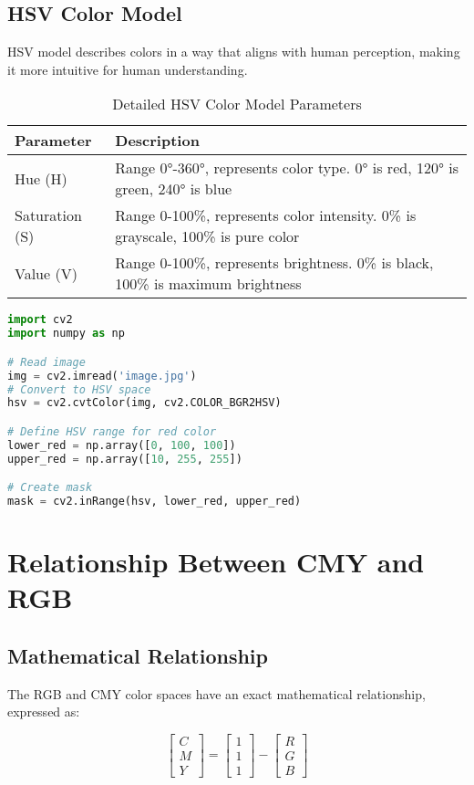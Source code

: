 \documentclass[12pt]{article}
\begin{document}
\subsection{HSV Color Model}
HSV model describes colors in a way that aligns with human perception, making it more intuitive for human understanding.

\begin{table}[H]
    \centering
    \begin{tabular}{lp{12cm}}
    \toprule
    \textbf{Parameter} & \textbf{Description} \\
    \midrule
    Hue (H) & Range 0°-360°, represents color type. 0° is red, 120° is green, 240° is blue \\
    Saturation (S) & Range 0-100\%, represents color intensity. 0\% is grayscale, 100\% is pure color \\
    Value (V) & Range 0-100\%, represents brightness. 0\% is black, 100\% is maximum brightness \\
    \bottomrule
    \end{tabular}
    \caption{Detailed HSV Color Model Parameters}
\end{table}

\begin{lstlisting}[language=python, caption=HSV Color Detection in OpenCV]
import cv2
import numpy as np

# Read image
img = cv2.imread('image.jpg')
# Convert to HSV space
hsv = cv2.cvtColor(img, cv2.COLOR_BGR2HSV)

# Define HSV range for red color
lower_red = np.array([0, 100, 100])
upper_red = np.array([10, 255, 255])

# Create mask
mask = cv2.inRange(hsv, lower_red, upper_red)
\end{lstlisting}

\section{Relationship Between CMY and RGB}

\subsection{Mathematical Relationship}
The RGB and CMY color spaces have an exact mathematical relationship, expressed as:

\begin{equation}
\begin{bmatrix}
C\\
M\\
Y
\end{bmatrix}
=
\begin{bmatrix}
1\\
1\\
1
\end{bmatrix}
-
\begin{bmatrix}
R\\
G\\
B
\end{bmatrix}
\end{equation}
\end{document}
